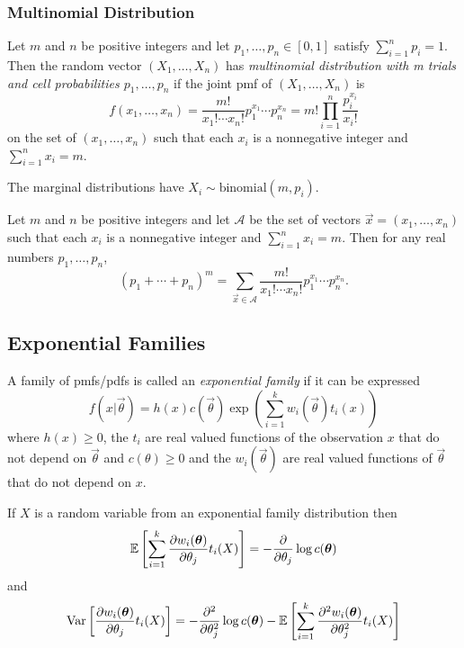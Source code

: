 \subsubsection{Multinomial Distribution}
\begin{definition}
    Let $m$ and $n$ be positive integers and let $p_1, \dots, p_n \in [0, 1]$ satisfy $\sum_{i=1}^n p_i = 1$. Then the random vector $(X_1, \dots, X_n)$ has \emph{multinomial distribution with m trials and cell probabilities $p_1, \dots, p_n$} if the joint pmf of $(X_1, \dots, X_n)$ is 
    \[
        f(x_1, \dots , x_n) = \frac{m!}{x_1! \cdots x_n!} p_1^{x_1} \cdots
p_n^{x_n} = m! \prod_{i=1}^n \frac{p_i^{x_i}}{x_i!} 
    \]
    on the set of $(x_1, \dots, x_n)$ such that each $x_i$ is a nonnegative integer and $\sum_{i=1}^n x_i = m$.
\end{definition}

\begin{remark}
    The marginal distributions have $X_i \sim \text{binomial}(m, p_i)$.
\end{remark}

\begin{theorem}
    Let $m$ and $n$ be positive integers and let $\mathcal{A}$ be the set of vectors $\vec{x} = (x_1, \dots, x_n)$ such that each $x_i$ is a nonnegative integer and $\sum_{i=1}^n x_i = m$. Then for any real numbers $p_1, \dots, p_n$,
    \[
        (p_1 + \cdots + p_n)^m = \sum_{\vec{x} \in \mathcal{A}} \frac{m!}{x_1! \cdots x_n!} p_1^{x_1}\cdots p_n^{x_n}.
    \]
\end{theorem}


\subsection{Exponential Families}

\begin{definition}
    A family of pmfs/pdfs is called an \emph{exponential family} if it can be expressed
    \[
          f(x|\vec{\theta}) = h(x)c(\vec{\theta})\exp\left( \sum_{i=1}^k w_i(\vec{\theta}) t_i(x) \right)
    \]
    where $h(x) \geq 0$, the $t_i$ are real valued functions of the observation $x$ that do not depend on $\vec{\theta}$ and $c(\theta) \geq 0$ and the $w_i(\vec{\theta})$ are real valued functions of $\vec{\theta}$ that do not depend on $x$.
\end{definition}

\begin{theorem}
    If $X$ is a random variable from an exponential family distribution then
    \[
        \mathbb{E}{}\left[ \sum_{i=1}^k \frac{\partial w_i(\bm{\theta})}{\partial \theta_j} t_i(X) \right] = - \frac{\partial}{\partial \theta_j} \log c(\bm{\theta})
    \]
    and
    \[
        \text{Var}\left[ \frac{\partial w_i(\bm{\theta})}{\partial \theta_j} t_i(X) \right] = - \frac{\partial^2}{\partial \theta_j^2} \log c(\bm{\theta}) - \mathbb{E}{}\left[ \sum_{i=1}^{k} \frac{\partial^2 w_i(\bm{\theta})}{\partial \theta_j^2} t_i(X) \right]
    \]
\end{theorem}

